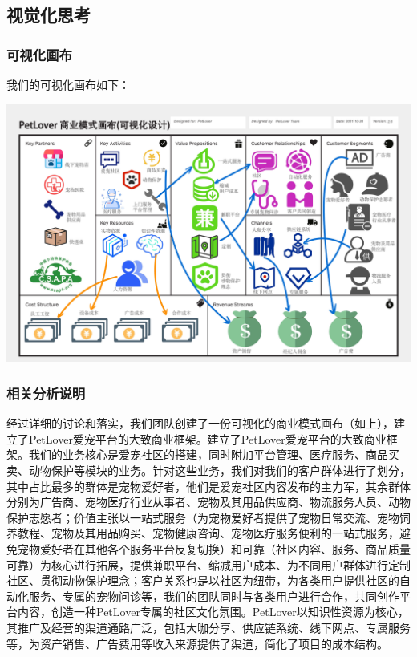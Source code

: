 \documentclass[a4paper]{ctexart}
\begin{document}
\subsection{视觉化思考}

\subsubsection{可视化画布}

我们的可视化画布如下：

\begin{center}
  \includegraphics[width=16cm]{./可视化画布/可视化商业画布v2（带联系版）}
\end{center}

\subsubsection{相关分析说明}

经过详细的讨论和落实，我们团队创建了一份可视化的商业模式画布（如上），建立了PetLover爱宠平台的大致商业框架。建立了PetLover爱宠平台的大致商业框架。我们的业务核心是爱宠社区的搭建，同时附加平台管理、医疗服务、商品买卖、动物保护等模块的业务。针对这些业务，我们对我们的客户群体进行了划分，其中占比最多的群体是宠物爱好者，他们是爱宠社区内容发布的主力军，其余群体分别为广告商、宠物医疗行业从事者、宠物及其用品供应商、物流服务人员、动物保护志愿者；价值主张以一站式服务（为宠物爱好者提供了宠物日常交流、宠物饲养教程、宠物及其用品购买、宠物健康咨询、宠物医疗服务便利的一站式服务，避免宠物爱好者在其他各个服务平台反复切换）和可靠（社区内容、服务、商品质量可靠）为核心进行拓展，提供兼职平台、缩减用户成本、为不同用户群体进行定制社区、贯彻动物保护理念；客户关系也是以社区为纽带，为各类用户提供社区的自动化服务、专属的宠物问诊等，我们的团队同时与各类用户进行合作，共同创作平台内容，创造一种PetLover专属的社区文化氛围。PetLover以知识性资源为核心，其推广及经营的渠道通路广泛，包括大咖分享、供应链系统、线下网点、专属服务等，为资产销售、广告费用等收入来源提供了渠道，简化了项目的成本结构。
\end{document}
